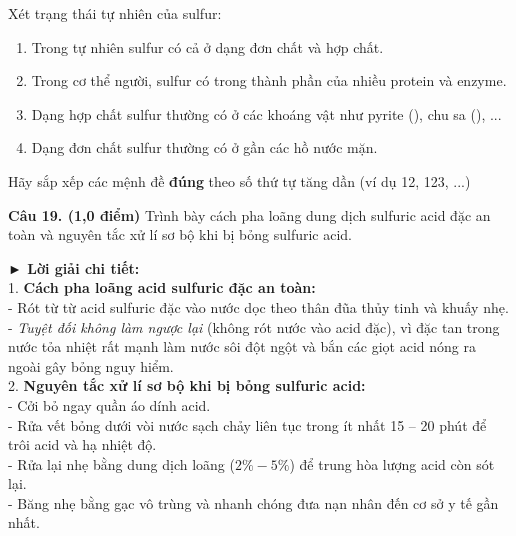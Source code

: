 \documentclass[11pt,a4paper]{article}
\begin{document}
\begin{ex}
Xét trạng thái tự nhiên của sulfur:
\begin{enumerate}[label=\arabic*),noitemsep,topsep=2pt]
\item Trong tự nhiên sulfur có cả ở dạng đơn chất và hợp chất.
\item Trong cơ thể người, sulfur có trong thành phần của nhiều protein và enzyme.
\item Dạng hợp chất sulfur thường có ở các khoáng vật như pyrite (), chu sa (), ...
\item Dạng đơn chất sulfur thường có ở gần các hồ nước mặn.
\end{enumerate}
Hãy sắp xếp các mệnh đề \textbf{đúng} theo số thứ tự tăng dần (ví dụ 12, 123, ...)
\end{ex}

\vspace{6pt}
\vspace{4pt}

\noindent\textbf{Câu 19. (1,0 điểm)} Trình bày cách pha loãng dung dịch sulfuric acid đặc an toàn và nguyên tắc xử lí sơ bộ khi bị bỏng sulfuric acid.

\begin{tcolorbox}[colback=white,colframe=solBlue,arc=1mm,boxrule=0.5pt,top=2mm,bottom=2mm,left=3mm,right=3mm]
{\color{solBlue}\textbf{► Lời giải chi tiết:}}\\
1. \textbf{Cách pha loãng acid sulfuric đặc an toàn:}\\
- Rót từ từ acid sulfuric đặc vào nước dọc theo thân đũa thủy tinh và khuấy nhẹ.\\
- \textit{Tuyệt đối không làm ngược lại} (không rót nước vào acid đặc), vì  đặc tan trong nước tỏa nhiệt rất mạnh làm nước sôi đột ngột và bắn các giọt acid nóng ra ngoài gây bỏng nguy hiểm.\\
2. \textbf{Nguyên tắc xử lí sơ bộ khi bị bỏng sulfuric acid:}\\
- Cởi bỏ ngay quần áo dính acid.\\
- Rửa vết bỏng dưới vòi nước sạch chảy liên tục trong ít nhất 15 -- 20 phút để trôi acid và hạ nhiệt độ.\\
- Rửa lại nhẹ bằng dung dịch  loãng ($2\% - 5\%$) để trung hòa lượng acid còn sót lại.\\
- Băng nhẹ bằng gạc vô trùng và nhanh chóng đưa nạn nhân đến cơ sở y tế gần nhất.
\end{tcolorbox}
\end{document}
